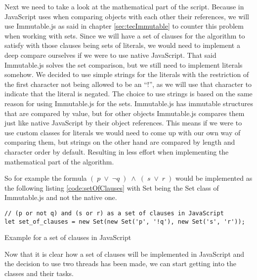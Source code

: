 Next we need to take a look at the mathematical part of the script. Because in JavaScript uses when comparing objects with each other their references, we will use Immutable.js as said in chapter \ref{sec:tecImmutable} to counter this problem when working with sets. Since we will have a set of clauses for the algorithm to satisfy with those clauses being sets of literals, we would need to implement a deep compare ourselves if we were to use native JavaScript. That said Immutable.js solves the set comparison, but we still need to implement literals somehow. We decided to use simple strings for the literals with the restriction of the first character not being allowed to be an ``!'', as we will use that character to indicate that the literal is negated. The choice to use strings is based on the same reason for using Immutable.js for the sets. Immutable.js has immutable structures that are compared by value, but for other objects Immutable.js compares them just like native JavaScript by their object references. This means if we were to use custom classes for literals we would need to come up with our own way of comparing them, but strings on the other hand are compared by length and character order by default. Resulting in less effort when implementing the mathematical part of the algorithm.

So for example the formula $(\; p\; \lor\; \neg q\; )\; \land\; (\; s\; \lor\; r\; )$ would be implemented as the following listing \ref{code:setOfClauses} with Set being the Set class of Immutable.js and not the native one.

\begin{listing}[h!]
\begin{verbatim}
// (p or not q) and (s or r) as a set of clauses in JavaScript
let set_of_clauses = new Set(new Set('p', '!q'), new Set('s', 'r'));
\end{verbatim}
    \caption{Example for a set of clauses in JavaScript}
    \label{code:setOfClauses}
\end{listing}

Now that it is clear how a set of clauses will be implemented in JavaScript and the decision to use two threads has been made, we can start getting into the classes and their tasks.

